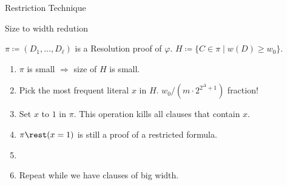 \begin{frame}{Restriction Technique}

    \alert{Size to width redution}

    \vspace{0.3cm}
    \pause
    $\pi \coloneqq (D_1, \dots, D_{\ell})$ is a Resolution proof of $\varphi$. $H \coloneqq \{C \in \pi
    \mid w(D) \ge w_0 \}$.

    \begin{enumerate}
        \item $\pi$ is small $\Rightarrow$ size of $H$ is small.
        \pause
        \item Pick the most frequent literal $x$ in $H$. \alert{$w_0 / (m \cdot 2^{2^{\Delta} + 1})$ fraction!} 
        \pause
        \item Set $x$ to $1$ in $\pi$. This operation kills all clauses that contain $x$.
        \pause
        \item $\pi \rest (x = 1)$ is still a proof of a restricted formula.
            \pause
        \item {}
        \pause
        \pause    
        \item Repeat while we have clauses of big width.
    \end{enumerate}


\end{frame}
